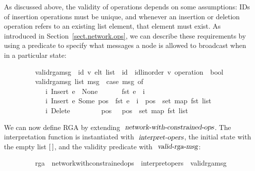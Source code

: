 As discussed above, the validity of operations depends on some assumptions: IDs of insertion operations must be unique, and whenever an insertion or deletion operation refers to an existing list element, that element must exist.
As introduced in Section~\ref{sect.network.ops}, we can describe these requirements by using a predicate to specify what messages a node is allowed to broadcast when in a particular state:
\vspace{0.275em}
\begin{isabellebody}
\ \ \ \ \ \ \ \ \ valid{\isacharunderscore}rga{\isacharunderscore}msg\ {\isacharcolon}{\isacharcolon}\ {\isachardoublequoteopen}{\isacharparenleft}{\isacharprime}id{\isacharcomma}\ {\isacharprime}v{\isacharparenright}\ elt\ list\ {\isasymRightarrow}\ {\isacharprime}id\ {\isasymtimes}\ {\isacharparenleft}{\isacharprime}id{\isacharcolon}{\isacharcolon}linorder{\isacharcomma}\ {\isacharprime}v{\isacharparenright}\ operation\ {\isasymRightarrow}\ bool{\isachardoublequoteclose}\ \isanewline
\ \ \ \ \ \ \ \ \ {\isachardoublequoteopen}valid{\isacharunderscore}rga{\isacharunderscore}msg\ list\ msg\ {\isasymequiv}\ case\ msg\ of\isanewline
\ \ \ \ \ \ \ \ \ \ \ \ {\isacharparenleft}i{\isacharcomma}\ Insert\ e\ \ None\ \ \ \ \ {\isacharparenright}\ {\isasymRightarrow}\ fst\ e\ {\isacharequal}\ i\ {\isacharbar}\isanewline
\ \ \ \ \ \ \ \ \ \ \ \ {\isacharparenleft}i{\isacharcomma}\ Insert\ e\ {\isacharparenleft}Some\ pos{\isacharparenright}{\isacharparenright}\ {\isasymRightarrow}\ fst\ e\ {\isacharequal}\ i\ {\isasymand}\ pos\ {\isasymin}\ set\ {\isacharparenleft}map\ fst\ list{\isacharparenright}\ {\isacharbar}\isanewline
\ \ \ \ \ \ \ \ \ \ \ \ {\isacharparenleft}i{\isacharcomma}\ Delete\ \ \ \ \ \ \ \ \ pos\ {\isacharparenright}\ {\isasymRightarrow}\ pos\ {\isasymin}\ set\ {\isacharparenleft}map\ fst\ list{\isacharparenright}{\isachardoublequoteclose}
\end{isabellebody}
\vspace{0.275em}
We can now define RGA by extending $\isa{network-with-constrained-ops}$. The interpretation function is instantiated with $\isa{interpret-opers}$, the initial state with the empty list $\emph{$[$}\,\emph{$]$}$, and the validity predicate with $\isa{valid-rga-msg}$:
\vspace{0.275em}
\begin{isabellebody}
\ \ \ \ \ \ \ \ \ rga\ {\isacharequal}\ network{\isacharunderscore}with{\isacharunderscore}constrained{\isacharunderscore}ops\ {\isacharunderscore}\ interpret{\isacharunderscore}opers\ {\isachardoublequoteopen}{\isacharbrackleft}{\isacharbrackright}{\isachardoublequoteclose}\ valid{\isacharunderscore}rga{\isacharunderscore}msg
\end{isabellebody}
\vspace{0.275em}

